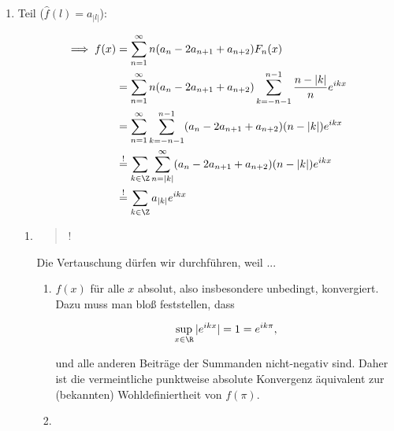 \begin{solution}
\begin{enumerate}[label = \arabic*.]
    \item Teil ($\hat f(l) = a_{|l|}$):
    

    \begin{align*}
        \implies
        f(x)
        & =
        \sum_{n=1}^\infty
        n (a_n - 2 a_{n+1} + a_{n+2})
        F_n(x) \\
        & =
        \sum_{n=1}^\infty
        n (a_n - 2 a_{n+1} + a_{n+2})
        \sum_{k = -n-1}^{n-1}
        \frac{n - |k|}{n}
        e^{i k x} \\
        & =
        \sum_{n=1}^\infty
        \sum_{k = -n-1}^{n-1}
        (a_n - 2 a_{n+1} + a_{n+2})
        (n - |k|)
        e^{i k x} \\
        & \stackrel{!}{=}
        \sum_{k \in \Z}
        \sum_{n = |k|}^\infty
        (a_n - 2 a_{n+1} + a_{n+2})
        (n - |k|)
        e^{i k x} \\
        & \stackrel{!}{=}
        \sum_{k \in \Z}
        a_{|k|}
        e^{i k x}
    \end{align*}

    \begin{enumerate}[label = \arabic*.]

        \item \blockquote{!}:

        Die Vertauschung dürfen wir durchführen, weil ...

        \begin{enumerate}[label = \arabic*.]
    
            \item $f(x)$ für alle $x$ absolut, also insbesondere unbedingt, konvergiert.
            Dazu muss man bloß feststellen, dass
    
            \begin{align*}
                \sup_{x \in \R} |e^{i k x}|
                =
                1
                =
                e^{i k \pi},
            \end{align*}
    
            und alle anderen Beiträge der Summanden nicht-negativ sind.
            Daher ist die vermeintliche punktweise absolute Konvergenz äquivalent zur (bekannten) Wohldefiniertheit von $f(\pi)$.
    
            \item \phantom{}
    

\end{enumerate}
\end{enumerate}
\end{enumerate}
\end{solution}
